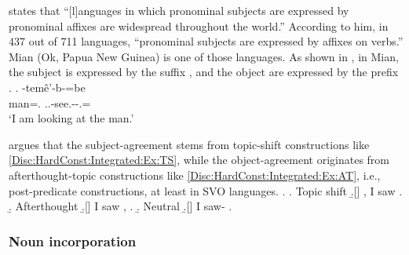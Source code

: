  states that
``[l]anguages in which pronominal subjects are expressed by pronominal affixes are widespread throughout the world.''
According to him,
in 437 out of 711 languages,
``pronominal subjects are expressed by affixes on verbs.''
Mian (Ok, Papua New Guinea) is one of those languages.
As shown in \Next, in Mian,
the subject is expressed by the suffix , and
the object are expressed by the prefix .
%
\exg.
   -tem\^{e}'-b-=be \\
  man=. ..-see.--.= \\
 `I am looking at the man.'
 \hfill{\cite[261]{fedden07}}


 argues that
the subject-agreement stems from topic-shift constructions like \ref{Disc:HardConst:Integrated:Ex:TS},
while the object-agreement originates from afterthought-topic constructions like \ref{Disc:HardConst:Integrated:Ex:AT},
i.e., post-predicate constructions,
at least in SVO languages.
%
\ex.\label{Disc:HardConst:Integrated:Ex:AT}
 \a. Topic shift
 \b.[] , I saw .
 \b. Afterthought
 \b.[] I saw , .
 \b. Neutral
 \b.[] I saw- .




\subsubsection{Noun incorporation}

